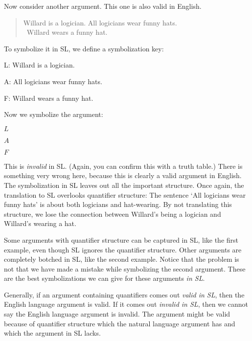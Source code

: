 Now consider another argument. This one is also valid in English.

\begin{quote}
\label{willard1}
Willard is a logician. All logicians wear funny hats.\\
\therefore\ Willard wears a funny hat.
\end{quote}

To symbolize it in SL, we define a symbolization key:
\begin{ekey}
\item[L:] Willard is a logician.
\item[A:] All logicians wear funny hats.
\item[F:] Willard wears a funny hat.
\end{ekey}

Now we symbolize the argument:
\begin{earg}
\item[]$L$
\item[]$A$
\item[\therefore] $F$
\end{earg}

This is \emph{invalid} in SL. (Again, you can confirm this with a truth table.) There is something very wrong here, because this is clearly a valid argument in English. The symbolization in SL leaves out all the important structure. Once again, the translation to SL overlooks quantifier structure: The sentence `All logicians wear funny hats' is about both logicians and hat-wearing. By not translating this structure, we lose the connection between Willard's being a logician and Willard's wearing a hat.

Some arguments with quantifier structure can be captured in SL, like the first example, even though SL ignores the quantifier structure. Other arguments are completely botched in SL, like the second example. Notice that the problem is not that we have made a mistake while symbolizing the second argument. These are the best symbolizations we can give for these arguments \emph{in SL}.


Generally, if an argument containing quantifiers comes out \emph{valid in SL}, then the English language argument is valid. If it comes out \emph{invalid in SL}, then we cannot say the English language argument is invalid. The argument might be valid because of quantifier structure which the natural language argument has and which the argument in SL lacks.


